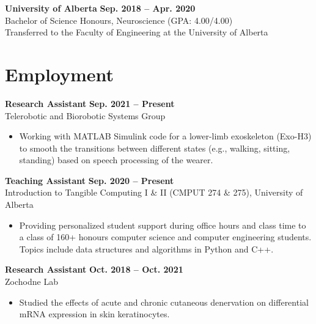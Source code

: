 \documentclass{article}
\begin{document}
\textbf{University of Alberta} \hfill \textbf{Sep. 2018 -- Apr. 2020} \\
Bachelor of Science Honours, Neuroscience (GPA: 4.00/4.00) \\
Transferred to the Faculty of Engineering at the University of Alberta


\section*{\textcolor{my_colour}{Employment}}
\vspace{-.25em} \hrulefill \vspace{.75em}

\textbf{Research Assistant} \hfill \textbf{Sep. 2021 -- Present}\\
Telerobotic and Biorobotic Systems Group
\begin{itemize}
    \item Working with MATLAB Simulink code for a lower-limb exoskeleton (Exo-H3) to smooth the transitions between different states (e.g., walking, sitting, standing) based on speech processing of the wearer.
\end{itemize}

\textbf{Teaching Assistant} \hfill \textbf{Sep. 2020 -- Present}\\
Introduction to Tangible Computing I \& II (CMPUT 274 \& 275), University of Alberta
\begin{itemize}
    \item Providing personalized student support during office hours and class time to a class of 160+ honours computer science and computer engineering students. Topics include data structures and algorithms in Python and C++.
\end{itemize}

\textbf{Research Assistant} \hfill \textbf{Oct. 2018 -- Oct. 2021}\\
Zochodne Lab
\begin{itemize}
    \item Studied the effects of acute and chronic cutaneous denervation on differential mRNA expression in skin keratinocytes.
\end{itemize}


\end{document}
